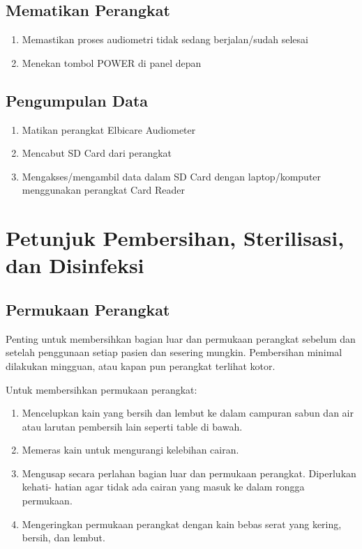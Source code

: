\documentclass[11pt,a4paper,twoside,onecolumn]{book}
\begin{document}
		\section{Mematikan Perangkat}
		\begin{enumerate}
			\item Memastikan proses audiometri tidak sedang berjalan/sudah selesai
			\item Menekan tombol POWER di panel depan
		\end{enumerate}
	
		\section{Pengumpulan Data}
		\begin{enumerate}
			\item Matikan perangkat Elbicare Audiometer
			\item Mencabut SD Card dari perangkat 
			\item Mengakses/mengambil data dalam SD Card dengan laptop/komputer menggunakan perangkat Card Reader 
		\end{enumerate}
	
	\newpage
	
	\chapter{Petunjuk Pembersihan, Sterilisasi, dan Disinfeksi}
		\section{Permukaan Perangkat}
		Penting untuk membersihkan bagian luar dan permukaan perangkat sebelum dan setelah penggunaan setiap pasien dan sesering mungkin. Pembersihan minimal dilakukan mingguan, atau kapan pun perangkat terlihat kotor.
		
		Untuk membersihkan permukaan perangkat:
		\begin{enumerate}
			\item Mencelupkan kain yang bersih dan lembut ke dalam campuran sabun dan air atau larutan pembersih lain seperti table di bawah.
			\item Memeras kain untuk mengurangi kelebihan cairan.
			\item Mengusap secara perlahan bagian luar dan permukaan perangkat. Diperlukan kehati- hatian agar tidak ada cairan yang masuk ke dalam rongga permukaan.
			\item Mengeringkan permukaan perangkat dengan kain bebas serat yang kering, bersih, dan lembut.
		\end{enumerate}
		
\end{document}
